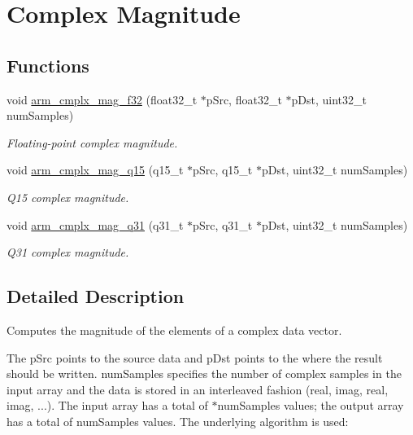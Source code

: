 \hypertarget{group__cmplx__mag}{}\section{Complex Magnitude}
\label{group__cmplx__mag}
\subsection*{Functions}
\begin{DoxyCompactItemize}
\item 
void \hyperlink{group__cmplx__mag_gae45024c497392cde2ae358a76d435213}{arm\+\_\+cmplx\+\_\+mag\+\_\+f32} (float32\+\_\+t $\ast$p\+Src, float32\+\_\+t $\ast$p\+Dst, uint32\+\_\+t num\+Samples)
\begin{DoxyCompactList}\small\item\em Floating-\/point complex magnitude. \end{DoxyCompactList}\item 
void \hyperlink{group__cmplx__mag_ga0a4a8f77a6a51d9b3f3b9d729f85b7a4}{arm\+\_\+cmplx\+\_\+mag\+\_\+q15} (q15\+\_\+t $\ast$p\+Src, q15\+\_\+t $\ast$p\+Dst, uint32\+\_\+t num\+Samples)
\begin{DoxyCompactList}\small\item\em Q15 complex magnitude. \end{DoxyCompactList}\item 
void \hyperlink{group__cmplx__mag_ga14f82f9230e9d96d5b9774e2fefcb7be}{arm\+\_\+cmplx\+\_\+mag\+\_\+q31} (q31\+\_\+t $\ast$p\+Src, q31\+\_\+t $\ast$p\+Dst, uint32\+\_\+t num\+Samples)
\begin{DoxyCompactList}\small\item\em Q31 complex magnitude. \end{DoxyCompactList}\end{DoxyCompactItemize}


\subsection{Detailed Description}
Computes the magnitude of the elements of a complex data vector.

The {\ttfamily p\+Src} points to the source data and {\ttfamily p\+Dst} points to the where the result should be written. {\ttfamily num\+Samples} specifies the number of complex samples in the input array and the data is stored in an interleaved fashion (real, imag, real, imag, ...). The input array has a total of {$\ast$num\+Samples} values; the output array has a total of {\ttfamily num\+Samples} values. The underlying algorithm is used\+:


